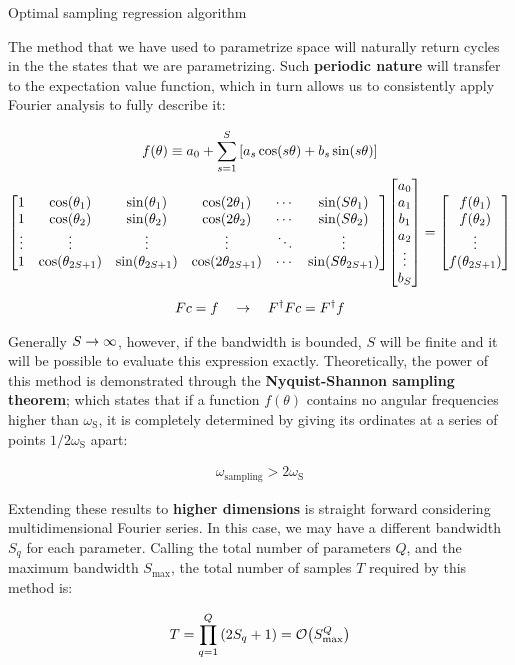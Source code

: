 \documentclass[9pt, aspectratio=169]{beamer}
\begin{document}
\begin{frame}[allowframebreaks]{Optimal sampling regression algorithm}

	The method that we have used to parametrize space will naturally return cycles in the the states that we are parametrizing. Such \textbf{periodic nature} will transfer to the expectation value function, which in turn allows us to consistently apply Fourier analysis to fully describe it:

	\begin{gather*}
	  f(\theta) \equiv a_0 + \sum_{s=1}^S \qty[a_s\cos(s\theta) + b_s\sin(s\theta)] \\
	  \mqty[
	    1 & \cos(\theta_1) & \sin(\theta_1) & \cos(2\theta_1)
	      & \cdots & \sin(S\theta_1) \\
	    1 & \cos(\theta_2) & \sin(\theta_2) & \cos(2\theta_2)
	      & \cdots & \sin(S\theta_2) \\
	    \vdots & \vdots & \vdots & \vdots & \ddots & \vdots \\
	    1 & \cos(\theta_{2S+1}) & \sin(\theta_{2S+1}) & \cos(2\theta_{2S+1})
	      & \cdots & \sin(S\theta_{2S+1})
	  ]
	  \mqty[
	    a_0 \\ a_1 \\ b_1 \\ a_2 \\ \vdots \\ b_S
	  ] =
	  \mqty[
	    f(\theta_1) \\ f(\theta_2) \\ \vdots \\ f(\theta_{2S+1})
	  ] \\[5pt]
	  Fc = f \qra F^{\dagger}Fc = F^{\dagger}f
	\end{gather*}

\break

	Generally $S \rightarrow \infty$, however, if the bandwidth is bounded, $S$ will be finite and it will be possible to evaluate this expression exactly. Theoretically, the power of this method is demonstrated through the \textbf{Nyquist-Shannon sampling theorem}; which states that if a function $f(\theta)$ contains no angular frequencies higher than $\omega_{\text{S}}$, it is completely determined by giving its ordinates at a series of points $1/2\omega_{\text{S}}$ apart:

	\begin{gather*}
	  \omega_{\text{sampling}} > 2\omega_{\text{S}}
	\end{gather*}

	Extending these results to \textbf{higher dimensions} is straight forward considering multidimensional Fourier series. In this case, we may have a different bandwidth $S_{q}$ for each parameter. Calling the total number of parameters $Q$, and the maximum bandwidth $S_{\text{max}}$, the total number of samples $T$ required by this method is:

	\begin{gather*}
	  T = \prod_{q=1}^{Q} \qty(2 S_{q} + 1) = \order{S_{\text{max}}^{Q}}
	\end{gather*}

\end{frame}

\end{document}
